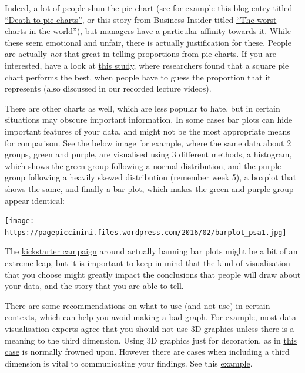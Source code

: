 \documentclass[
]{book}
\begin{document}
Indeed, a lot of people shun the pie chart (see for example this blog entry titled \href{http://www.storytellingwithdata.com/blog/2011/07/death-to-pie-charts}{``Death to pie charts''}, or this story from Business Insider titled \href{http://www.businessinsider.com/pie-charts-are-the-worst-2013-6?IR=T}{``The worst charts in the world''}), but managers have a particular affinity towards it. While these seem emotional and unfair, there is actually justification for these. People are actually \emph{not} that great in telling proportions from pie charts. If you are interested, have a look at \href{https://eagereyes.org/blog/2016/a-reanalysis-of-a-study-about-square-pie-charts-from-2009}{this study}, where researchers found that a square pie chart performs the best, when people have to guess the proportion that it represents (also discussed in our recorded lecture videos).

There are other charts as well, which are less popular to hate, but in certain situations may obscure important information. In some cases bar plots can hide important features of your data, and might not be the most appropriate means for comparison. See the below image for example, where the same data about 2 groups, green and purple, are visualised using 3 different methods, a histogram, which shows the green group following a normal distribution, and the purple group following a heavily skewed distribution (remember week 5), a boxplot that shows the same, and finally a bar plot, which makes the green and purple group appear identical:

\texttt{[image: https://pagepiccinini.files.wordpress.com/2016/02/barplot\_psa1.jpg]}

The \href{https://www.kickstarter.com/projects/1474588473/barbarplots/description}{kickstarter campaign} around actually banning bar plots might be a bit of an extreme leap, but it is important to keep in mind that the kind of visualisation that you choose might greatly impact the conclusions that people will draw about your data, and the story that you are able to tell.

There are some recommendations on what to use (and not use) in certain contexts, which can help you avoid making a bad graph. For example, most data visualisation experts agree that you should not use 3D graphics unless there is a meaning to the third dimension. Using 3D graphics just for decoration, as in \href{https://mir-s3-cdn-cf.behance.net/project_modules/disp/2505dd10837923.56030acd2ef20.jpg}{this case} is normally frowned upon. However there are cases when including a third dimension is vital to communicating your findings. See this \href{http://www.visualisingdata.com/2015/03/when-3d-works/}{example}.
\end{document}
